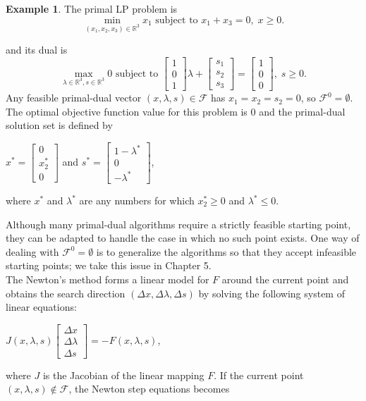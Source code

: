 \documentclass[a4paper,10 pt,titlepage,twoside]{book}
\theoremstyle{plain}
\theoremstyle{definition}
\newtheorem{ex}[thm]{Example}
\theoremstyle{remark}
\begin{document}
\begin{ex}
	The primal LP problem is
	\begin{equation*}
	\min\limits_{(x_{1},x_{2},x_{3})\in\mathbb{R}^{3}} x_{1} \text{ subject to }x_{1} + x_{3} = 0, \;x\geq0.
	\end{equation*}

and its dual is 
	\begin{equation*}
\max\limits_{\lambda\in\mathbb{R}^{3}, s\in\mathbb{R}^{3}} 0 \text{ subject to } \begin{bmatrix}1\\0\\1\end{bmatrix}\lambda+\begin{bmatrix}
s_{1}\\s_{2}\\s_{3}
\end{bmatrix}=\begin{bmatrix}1\\0\\0\end{bmatrix},\;s\geq0. 
\end{equation*}
Any feasible primal-dual vector $(x, \lambda, s)\in\mathcal{F}$ has $x_{1}= x_{2}= s_{2}= 0$, so $\mathcal{F}^{0}=\emptyset$. The optimal objective function value for this problem is 0 and the primal-dual solution set is defined by
\begin{center}
$x^{*} = \begin{bmatrix}
0\\x^{*}_{2}\\ 0
\end{bmatrix}$ and $s^{*}=\begin{bmatrix}
1-\lambda^{*}\\0\\-\lambda^{*}
\end{bmatrix}$,  
\end{center}
where $x^{*}$ and $\lambda^{*}$ are any numbers for which $x_{2}^{*}\geq0$ and $\lambda^{*}\leq0$.
\end{ex}
Although many primal-dual algorithms require a strictly feasible starting point, they can be adapted to handle the case in which no such point exists. One way of dealing with $\mathcal{F}^{0}=\emptyset$ is to generalize the algorithms so that
they accept infeasible starting points; we take this issue in Chapter 5. \\
The Newton's method forms a linear model for $\mathit{F}$ around the current point and obtains the search direction $(\Delta x,\Delta \lambda,\Delta s)$ by solving the following system of linear equations:
\begin{center}
	$\mathit{J}(x,\lambda,s)\begin{bmatrix}
	\Delta x\\\Delta\lambda \\\Delta s
	\end{bmatrix}=-\mathit{F}(x,\lambda,s)$,
\end{center}
where $\mathit{J}$ is the Jacobian of the linear mapping $\mathit{F}$. If the current point $(x, \lambda, s)\notin\mathcal{F}$, the Newton step equations becomes
\end{document}
